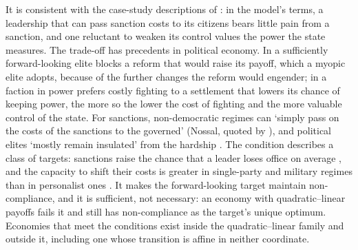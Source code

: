  It is consistent with the
case-study descriptions of : in the model's terms,
a leadership that can pass sanction costs to its citizens bears little pain from a sanction, and one
reluctant to weaken its control values the power the state measures. The trade-off has precedents in political
economy. In \citet[Example~1]{AcemogluEgorovSonin2012} a sufficiently forward-looking
elite blocks a reform that would raise its payoff, which a myopic elite adopts,
because of the further changes the reform would engender; in
\citet[pp.~189--190]{Powell2006} a faction in power prefers costly fighting to a
settlement that lowers its chance of keeping power, the more so the lower the cost
of fighting and the more valuable control of the state. For sanctions,
non-democratic regimes can `simply pass on the costs of the sanctions to the
governed' (Nossal, quoted by \citealp[p.~156]{HalcoussisKaempferLowenberg2021}),
and political elites `mostly remain insulated' from the hardship
\citep[p.~187]{Peksen2021}. The condition describes a class of targets: sanctions
raise the chance that a leader loses office on average \citep[p.~564]{Marinov2005},
and the capacity to shift their costs is greater in single-party and military
regimes than in personalist ones \citep[p.~341]{EscribaFolchWright2010}. It makes the forward-looking
target maintain non-compliance, and it is sufficient, not necessary: an economy with quadratic--linear
payoffs fails it and still has non-compliance as the target's unique optimum.
Economies that meet the conditions exist inside the quadratic--linear family and
outside it, including one whose transition is affine in neither coordinate.

